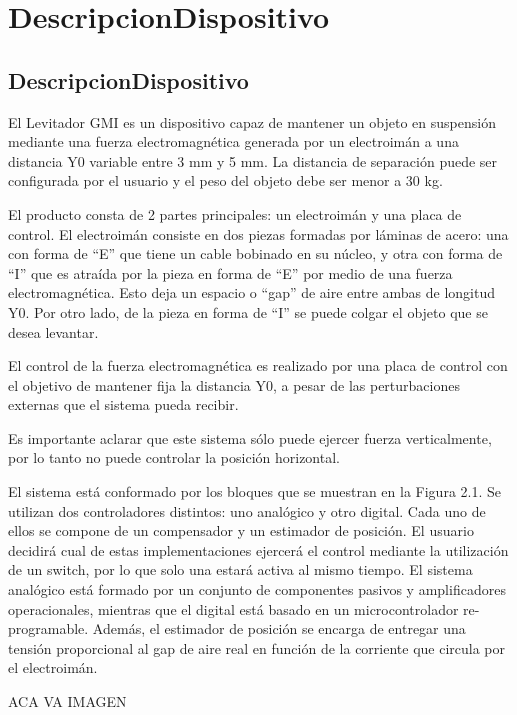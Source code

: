 \chapter{DescripcionDispositivo}  \label{cap:DescripcionDispositivo}

\section{DescripcionDispositivo}

El Levitador GMI es un dispositivo capaz de mantener un objeto en suspensión  mediante una fuerza electromagnética generada por un electroimán a una distancia Y0 variable entre 3 mm y 5 mm. La distancia de separación puede ser configurada por el usuario y el peso del objeto debe ser menor a 30 kg. 

El producto consta de 2 partes principales: un electroimán y una placa de control. El electroimán consiste en dos piezas formadas por láminas de acero: una con forma de “E” que tiene un cable bobinado en su núcleo, y otra con forma de “I” que es atraída por la pieza en forma de “E” por medio de una fuerza electromagnética. Esto deja un espacio o “gap” de aire entre ambas de longitud Y0. Por otro lado, de la pieza en forma de “I” se puede colgar el objeto que se desea levantar.

El control de la fuerza electromagnética es realizado por una placa de control con el objetivo de mantener fija la distancia Y0, a pesar de las perturbaciones externas que el sistema pueda recibir. 

Es importante aclarar que este sistema sólo puede ejercer fuerza verticalmente, por lo tanto no puede controlar la posición horizontal.

El sistema está conformado por los bloques que se muestran en la Figura 2.1. Se utilizan dos controladores distintos: uno analógico y otro digital. Cada uno de ellos se compone de un compensador y un estimador de posición.  El usuario decidirá cual de estas implementaciones ejercerá el control mediante la utilización de un switch, por lo que solo una estará activa al mismo tiempo. El sistema analógico está formado por un conjunto de componentes pasivos y amplificadores operacionales, mientras que el digital está basado en un microcontrolador re-programable. Además, el estimador de posición se encarga de  entregar una tensión proporcional al gap de aire real en función de  la corriente que circula por el electroimán.

ACA VA IMAGEN

